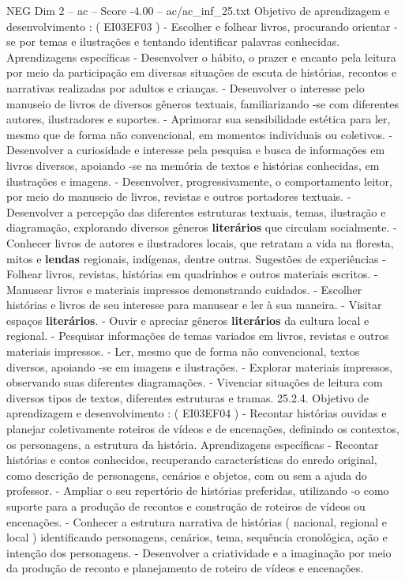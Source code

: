 \begin{textsample}{NEG Dim 2 – ac – Score -4.00 – ac/ac\_inf\_25.txt}
Objetivo de aprendizagem e desenvolvimento : ( EI03EF03 ) - Escolher e folhear livros, procurando orientar -se por temas e ilustrações e tentando identificar palavras conhecidas.
Aprendizagens específicas - Desenvolver o hábito, o prazer e encanto pela leitura por meio da participação em diversas situações de escuta de histórias, recontos e narrativas realizadas por adultos e crianças. - Desenvolver o interesse pelo manuseio de livros de diversos gêneros textuais, familiarizando -se com diferentes autores, ilustradores e suportes. - Aprimorar sua sensibilidade estética para ler, mesmo que de forma não convencional, em momentos individuais ou coletivos. - Desenvolver a curiosidade e interesse pela pesquisa e busca de informações em livros diversos, apoiando -se na memória de textos e histórias conhecidas, em ilustrações e imagens. - Desenvolver, progressivamente, o comportamento leitor, por meio do manuseio de livros, revistas e outros portadores textuais. - Desenvolver a percepção das diferentes estruturas textuais, temas, ilustração e diagramação, explorando diversos gêneros \textbf{literários} que circulam socialmente. - Conhecer livros de autores e ilustradores locais, que retratam a vida na floresta, mitos e \textbf{lendas} regionais, indígenas, dentre outras.
Sugestões de experiências - Folhear livros, revistas, histórias em quadrinhos e outros materiais escritos. - Manusear livros e materiais impressos demonstrando cuidados. - Escolher histórias e livros de seu interesse para manusear e ler à sua maneira. - Visitar espaços \textbf{literários}. - Ouvir e apreciar gêneros \textbf{literários} da cultura local e regional. - Pesquisar informações de temas variados em livros, revistas e outros materiais impressos. - Ler, mesmo que de forma não convencional, textos diversos, apoiando -se em imagens e ilustrações. - Explorar materiais impressos, observando suas diferentes diagramações. - Vivenciar situações de leitura com diversos tipos de textos, diferentes estruturas e tramas. 25.2.4.
Objetivo de aprendizagem e desenvolvimento : ( EI03EF04 ) - Recontar histórias ouvidas e planejar coletivamente roteiros de vídeos e de encenações, definindo os contextos, os personagens, a estrutura da história.
Aprendizagens específicas - Recontar histórias e contos conhecidos, recuperando características do enredo original, como descrição de personagens, cenários e objetos, com ou sem a ajuda do professor. - Ampliar o seu repertório de histórias preferidas, utilizando -o como suporte para a produção de recontos e construção de roteiros de vídeos ou encenações. - Conhecer a estrutura narrativa de histórias ( nacional, regional e local ) identificando personagens, cenários, tema, sequência cronológica, ação e intenção dos personagens. - Desenvolver a criatividade e a imaginação por meio da produção de reconto e planejamento de roteiro de vídeos e encenações.

\end{textsample}
